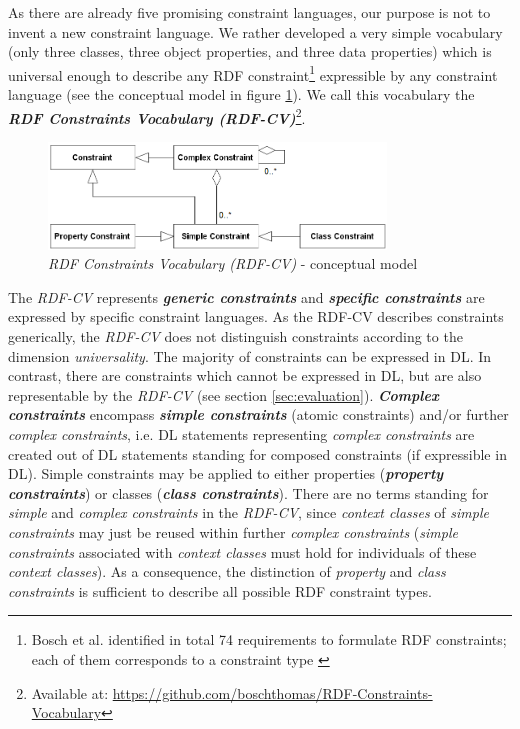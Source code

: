 \documentclass{llncs}
\newcommand{\tb}[1]{\todo[size=\small, color=green!40]{\textbf{Thomas:} #1}}
\begin{document}
As there are already five promising constraint languages, our purpose is not to invent a new constraint language.
We rather developed a very simple vocabulary (only three classes, three object properties, and three data properties) which is universal enough to describe any RDF constraint\footnote{Bosch et al. identified in total 74 requirements to formulate RDF constraints; each of them corresponds to a constraint type \cite{BoschNolleAcarEckert2015}} expressible by any constraint language (see the conceptual model in figure \ref{fig:RDF-CV-conceptual-model}).
We call this vocabulary the \textbf{\emph{RDF Constraints Vocabulary (RDF-CV)}}\footnote{Available at: \url{https://github.com/boschthomas/RDF-Constraints-Vocabulary}}.
\tb{make entry in LOV?}
\begin{figure}
	\centering
		\includegraphics[width=0.80\textwidth]{images/RDF-CV-conceptual-model.png}
	\caption{\emph{RDF Constraints Vocabulary (RDF-CV)} - conceptual model}
	\label{fig:RDF-CV-conceptual-model}
\end{figure}

The \emph{RDF-CV} represents \textbf{\emph{generic constraints}} and \textbf{\emph{specific constraints}} are expressed by specific constraint languages.
As the RDF-CV describes constraints generically, the \emph{RDF-CV} does not distinguish constraints according to the dimension \emph{universality}. 
The majority of constraints can be expressed in DL.
In contrast, there are constraints which cannot be expressed in DL, but are also representable by the \emph{RDF-CV} (see section \ref{sec:evaluation}). 
\textbf{\emph{Complex constraints}} encompass \textbf{\emph{simple constraints}} (atomic constraints) and/or further \emph{complex constraints},
i.e. DL statements representing \emph{complex constraints} are created out of DL statements standing for composed constraints (if expressible in DL). 
Simple constraints may be applied to either properties (\textbf{\emph{property constraints}}) or classes (\textbf{\emph{class constraints}}).
There are no terms standing for \emph{simple} and \emph{complex constraints} in the \emph{RDF-CV}, since \emph{context classes} of \emph{simple constraints} may just be reused within further \emph{complex constraints} (\emph{simple constraints} associated with \emph{context classes} must hold for individuals of these \emph{context classes}).
As a consequence, the distinction of \emph{property} and \emph{class constraints} is sufficient to describe all possible RDF constraint types.
\end{document}
